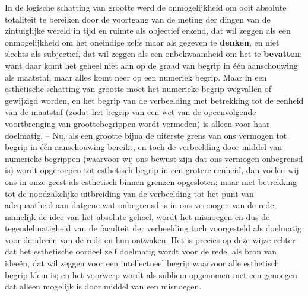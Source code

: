 In de logische schatting van grootte werd de onmogelijkheid om ooit absolute totaliteit te bereiken door de voortgang van de meting der dingen van de zintuiglijke wereld in tijd en ruimte als objectief erkend, dat wil zeggen als een onmogelijkheid om het oneindige zelfs maar als gegeven te \textbf{denken}, en niet slechts als subjectief, dat wil zeggen als een onbekwaamheid om het te \textbf{bevatten}; want daar komt het geheel niet aan op de graad van begrip in één aanschouwing als maatstaf, maar alles komt neer op een numeriek begrip. Maar in een esthetische schatting van grootte moet het numerieke begrip wegvallen of gewijzigd worden, en het begrip van de verbeelding met betrekking tot de eenheid van de maatstaf (zodat het begrip van een wet van de opeenvolgende voortbrenging van groottebegrippen wordt vermeden) is alleen voor haar doelmatig. – Nu, als een grootte bijna de uiterste grens van ons vermogen tot begrip in één aanschouwing bereikt, en toch de verbeelding door middel van numerieke begrippen (waarvoor wij ons bewust zijn dat ons vermogen onbegrensd is) wordt opgeroepen tot esthetisch begrip in een grotere eenheid, dan voelen wij ons in onze geest als esthetisch binnen grenzen opgesloten; maar met betrekking tot de noodzakelijke uitbreiding van de verbeelding tot het punt van adequaatheid aan datgene wat onbegrensd is in ons vermogen van de rede, namelijk de idee van het absolute geheel, wordt het misnoegen en dus de tegendelmatigheid van de faculteit der verbeelding toch voorgesteld als doelmatig voor de ideeën van de rede en hun ontwaken. Het is precies op deze wijze echter dat het esthetische oordeel zelf doelmatig wordt voor de rede, als bron van ideeën, dat wil zeggen voor een intellectueel begrip waarvoor alle esthetisch begrip klein is; en het voorwerp wordt als subliem opgenomen met een genoegen dat alleen mogelijk is door middel van een misnoegen.

